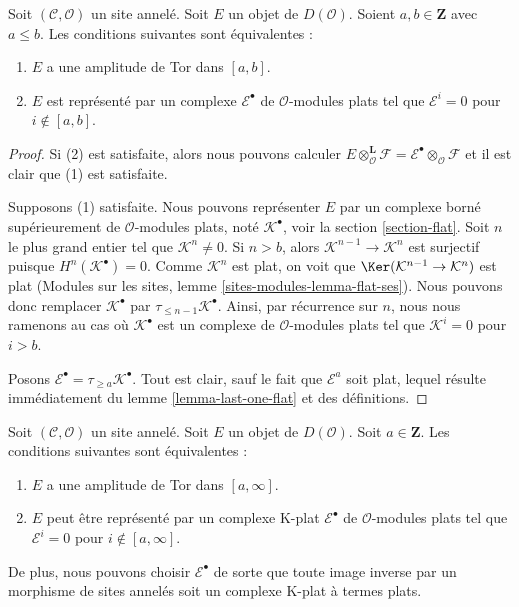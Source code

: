 \begin{lemma}
\label{lemma-tor-amplitude}
Soit $(\mathcal{C}, \mathcal{O})$ un site annelé. Soit $E$ un objet de
$D(\mathcal{O})$. Soient $a, b \in \mathbf{Z}$ avec $a \leq b$. Les
conditions suivantes sont équivalentes :
\begin{enumerate}
\item $E$ a une amplitude de Tor dans $[a, b]$.
\item $E$ est représenté par un complexe $\mathcal{E}^\bullet$ de
$\mathcal{O}$-modules plats tel que $\mathcal{E}^i = 0$ pour
$i \not \in [a, b]$.
\end{enumerate}
\end{lemma}

\begin{proof}
Si (2) est satisfaite, alors nous pouvons calculer
$E \otimes_\mathcal{O}^\mathbf{L} \mathcal{F} =
\mathcal{E}^\bullet \otimes_\mathcal{O} \mathcal{F}$
et il est clair que (1) est satisfaite.

\medskip\noindent
Supposons (1) satisfaite. Nous pouvons représenter $E$ par un complexe borné
supérieurement de $\mathcal{O}$-modules plats, noté $\mathcal{K}^\bullet$, voir
la section \ref{section-flat}. Soit $n$ le plus grand entier tel que
$\mathcal{K}^n \not = 0$. Si $n > b$, alors
$\mathcal{K}^{n - 1} \to \mathcal{K}^n$ est surjectif puisque
$H^n(\mathcal{K}^\bullet) = 0$. Comme $\mathcal{K}^n$ est plat, on voit que
$\Ker(\mathcal{K}^{n - 1} \to \mathcal{K}^n)$ est plat (Modules sur les sites,
lemme \ref{sites-modules-lemma-flat-ses}). Nous pouvons donc remplacer
$\mathcal{K}^\bullet$ par $\tau_{\leq n - 1}\mathcal{K}^\bullet$. Ainsi, par
récurrence sur $n$, nous nous ramenons au cas où $\mathcal{K}^\bullet$ est un complexe
de $\mathcal{O}$-modules plats tel que $\mathcal{K}^i = 0$ pour $i > b$.

\medskip\noindent
Posons $\mathcal{E}^\bullet = \tau_{\geq a}\mathcal{K}^\bullet$.
Tout est clair, sauf le fait que $\mathcal{E}^a$ soit plat, lequel résulte
immédiatement du lemme \ref{lemma-last-one-flat} et des définitions.
\end{proof}

\begin{lemma}
\label{lemma-bounded-below-tor-amplitude}
Soit $(\mathcal{C}, \mathcal{O})$ un site annelé. Soit $E$ un objet de
$D(\mathcal{O})$. Soit $a \in \mathbf{Z}$. Les conditions suivantes sont
équivalentes :
\begin{enumerate}
\item $E$ a une amplitude de Tor dans $[a, \infty]$.
\item $E$ peut être représenté par un complexe K-plat
$\mathcal{E}^\bullet$ de $\mathcal{O}$-modules plats tel que
$\mathcal{E}^i = 0$ pour $i \not \in [a, \infty]$.
\end{enumerate}
De plus, nous pouvons choisir $\mathcal{E}^\bullet$ de sorte que toute image
inverse par un morphisme de sites annelés soit un complexe K-plat à termes
plats.
\end{lemma}

